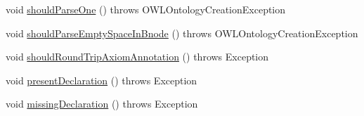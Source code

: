 \begin{DoxyCompactItemize}
\item 
void \hyperlink{classorg_1_1semanticweb_1_1owlapi_1_1api_1_1test_1_1syntax_1_1_turtle_test_case_a9fb2e0f4d6a366d3e566e6f1c1deb74d}{should\-Parse\-One} ()  throws O\-W\-L\-Ontology\-Creation\-Exception 
\item 
void \hyperlink{classorg_1_1semanticweb_1_1owlapi_1_1api_1_1test_1_1syntax_1_1_turtle_test_case_ad455a67fc58b6a57275bcc089fea0cb6}{should\-Parse\-Empty\-Space\-In\-Bnode} ()  throws O\-W\-L\-Ontology\-Creation\-Exception 
\item 
void \hyperlink{classorg_1_1semanticweb_1_1owlapi_1_1api_1_1test_1_1syntax_1_1_turtle_test_case_a5498d2bc6a7d807b5dd8e59b58675066}{should\-Round\-Trip\-Axiom\-Annotation} ()  throws Exception 
\item 
void \hyperlink{classorg_1_1semanticweb_1_1owlapi_1_1api_1_1test_1_1syntax_1_1_turtle_test_case_a1e868c9d1945ea31c418a59a2d7c9e43}{present\-Declaration} ()  throws Exception 
\item 
void \hyperlink{classorg_1_1semanticweb_1_1owlapi_1_1api_1_1test_1_1syntax_1_1_turtle_test_case_abc32e3ce89f4a12196b162642dc3719d}{missing\-Declaration} ()  throws Exception 
\end{DoxyCompactItemize}


